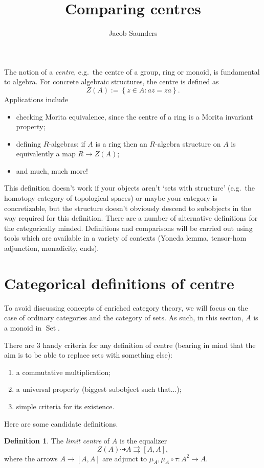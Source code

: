 \documentclass{article}
\title{Comparing centres}
\author{Jacob Saunders}
\newcommand{\set}[1]{\left\lbrace #1 \right\rbrace}
\DeclareMathOperator{\Set}{Set}
\theoremstyle{definition}
\newtheorem{definition}{Definition}
\begin{document}
\maketitle

The notion of a \textit{centre}, e.g.\ the centre of a group, ring or monoid, is fundamental to algebra.
For concrete algebraic structures, the centre is defined as
\[
  Z(A) := \set{z \in A : az = za}.
\]
Applications include
\begin{itemize}
  \item checking Morita equivalence, since the centre of a ring is a Morita invariant property;
  \item defining $R$-algebras: if $A$ is a ring then an $R$-algebra structure on $A$ is equivalently a map $R \to Z(A)$;
  \item and much, much more!
\end{itemize}

This definition doesn't work if your objects aren't `sets with structure' (e.g.\ the homotopy category of topological spaces) or maybe your category is concretizable, but the structure doesn't obviously descend to subobjects in the way required for this definition.
There are a number of alternative definitions for the categorically minded.
Definitions and comparisons will be carried out using tools which are available in a variety of contexts (Yoneda lemma, tensor-hom adjunction, monadicity, ends).

\section{Categorical definitions of centre}
To avoid discussing concepts of enriched category theory, we will focus on the case of ordinary categories and the category of sets.
As such, in this section, $A$ is a monoid in $\Set$.

There are 3 handy criteria for any definition of centre (bearing in mind that the aim is to be able to replace sets with something else):
\begin{enumerate}
  \item a commutative multiplication;
  \item a universal property (biggest subobject such that...);
  \item simple criteria for its existence.
\end{enumerate}
Here are some candidate definitions.

\begin{definition}
  The \textit{limit centre} of $A$ is the equalizer
  \[
    Z(A) \dashrightarrow A \rightrightarrows [A, A],
  \]
  where the arrows $A \to [A, A]$ are adjunct to $\mu_A, \mu_A \circ \tau : A^2 \to A$.
\end{definition}
\end{document}
